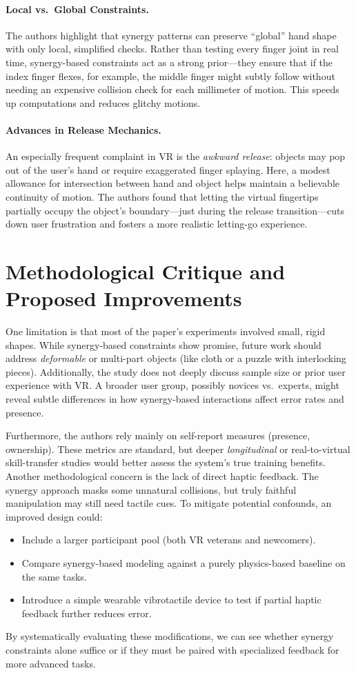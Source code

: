 \documentclass{llncs}
\begin{document}
\paragraph{Local vs.\ Global Constraints.}
The authors highlight that synergy patterns can preserve ``global'' hand shape with only local, simplified checks. Rather than testing every finger joint in real time, synergy-based constraints act as a strong prior---they ensure that if the index finger flexes, for example, the middle finger might subtly follow without needing an expensive collision check for each millimeter of motion. This speeds up computations and reduces glitchy motions.

\paragraph{Advances in Release Mechanics.}
An especially frequent complaint in VR is the \emph{awkward release}: objects may pop out of the user’s hand or require exaggerated finger splaying. Here, a modest allowance for intersection between hand and object helps maintain a believable continuity of motion. The authors found that letting the virtual fingertips partially occupy the object’s boundary—just during the release transition—cuts down user frustration and fosters a more realistic letting-go experience.

\section*{Methodological Critique and Proposed Improvements}
One limitation is that most of the paper’s experiments involved small, rigid shapes. While synergy-based constraints show promise, future work should address \emph{deformable} or multi-part objects (like cloth or a puzzle with interlocking pieces). Additionally, the study does not deeply discuss sample size or prior user experience with VR. A broader user group, possibly novices vs.\ experts, might reveal subtle differences in how synergy-based interactions affect error rates and presence.

Furthermore, the authors rely mainly on self-report measures (presence, ownership). These metrics are standard, but deeper \emph{longitudinal} or real-to-virtual skill-transfer studies would better assess the system's true training benefits. Another methodological concern is the lack of direct haptic feedback. The synergy approach masks some unnatural collisions, but truly faithful manipulation may still need tactile cues. To mitigate potential confounds, an improved design could:
\begin{itemize}
    \item Include a larger participant pool (both VR veterans and newcomers).
    \item Compare synergy-based modeling against a purely physics-based baseline on the same tasks.
    \item Introduce a simple wearable vibrotactile device to test if partial haptic feedback further reduces error.
\end{itemize}
By systematically evaluating these modifications, we can see whether synergy constraints alone suffice or if they must be paired with specialized feedback for more advanced tasks.
\end{document}

